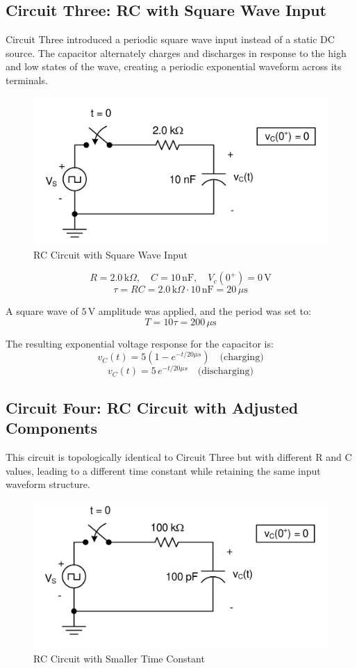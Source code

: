 \documentclass[12pt]{article}
\begin{document}
\subsection{Circuit Three: RC with Square Wave Input}
Circuit Three introduced a periodic square wave input instead of a static DC source. The capacitor alternately charges and discharges in response to the high and low states of the wave, creating a periodic exponential waveform across its terminals.

\begin{figure}[H]
	\centering
	\includegraphics[width=14cm]{e5_3}
	\caption{RC Circuit with Square Wave Input}
\end{figure}

\[
	R = 2.0\,\mathrm{k}\Omega, \quad C = 10\,\mathrm{nF}, \quad V_c(0^+) = 0\,\mathrm{V}
\]
\[
	\tau = RC = 2.0\,\mathrm{k}\Omega \cdot 10\,\mathrm{nF} = 20\,\mu\mathrm{s}
\]

A square wave of $5\,\mathrm{V}$ amplitude was applied, and the period was set to:
\[
	T = 10\tau = 200\,\mu\mathrm{s}
\]

The resulting exponential voltage response for the capacitor is:
\[
	v_C(t) = 5\left(1 - e^{-t/20\mu s}\right) \quad \text{(charging)}
\]
\[
	v_C(t) = 5\,e^{-t/20\mu s} \quad \text{(discharging)}
\]

\subsection{Circuit Four: RC Circuit with Adjusted Components}
This circuit is topologically identical to Circuit Three but with different R and C values, leading to a different time constant while retaining the same input waveform structure.

\begin{figure}[H]
	\centering
	\includegraphics[width=14cm]{e5_4}
	\caption{RC Circuit with Smaller Time Constant}
	\label{circuit3}
\end{figure}
\end{document}
